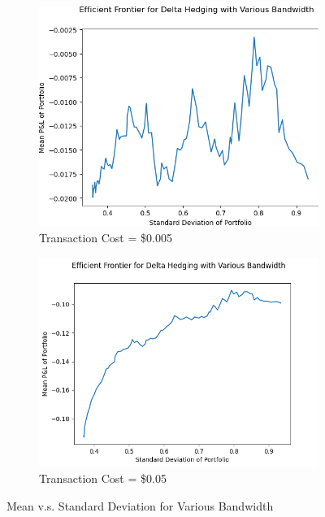 \documentclass[12pt]{article}
\begin{document}
\begin{figure}[H]
  \centering
  \begin{subfigure}{.5\textwidth}
    \centering
    \includegraphics[width=\linewidth]{efficientf1.png}
    \caption{Transaction Cost = \$0.005}
  \end{subfigure}%
  \begin{subfigure}{.5\textwidth}
    \centering
    \includegraphics[width=\linewidth]{efficientf2.png}
    \caption{Transaction Cost = \$0.05}
  \end{subfigure}%
  \caption{Mean v.s. Standard Deviation for Various Bandwidth}
\end{figure}
\end{document}

